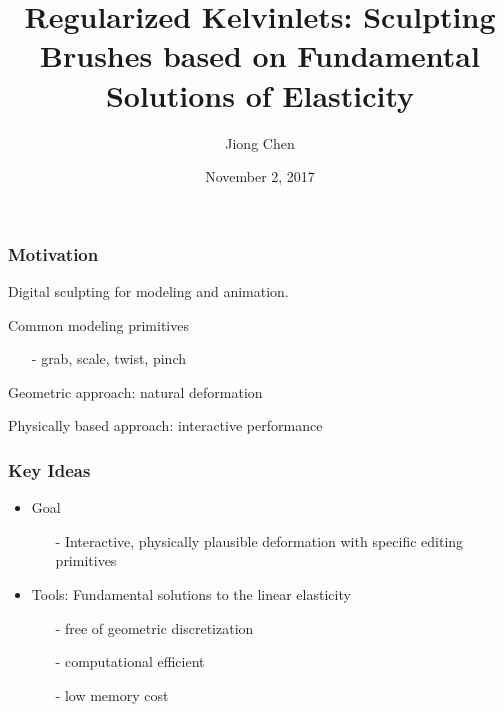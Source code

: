 \documentclass[serif,mathserif, 12pt]{beamer}
\author[Jiong Chen]{Jiong Chen}
\title[\hspace{2em}\insertframenumber/\inserttotalframenumber]{Regularized Kelvinlets: Sculpting Brushes based on Fundamental Solutions of Elasticity}
\date{November 2, 2017}
\begin{document}
\maketitle

\begin{frame}
  \frametitle{Motivation}
  \begin{itemize}
  \item Digital sculpting for modeling and animation.
     {\item Common modeling primitives}
     {
      \begin{itemize}
      \item[-] grab, scale, twist, pinch
      \end{itemize}
      }
     {\item Geometric approach: natural deformation}
     {\item Physically based approach: interactive performance}
  \end{itemize}
\end{frame}

\begin{frame}
  \frametitle{Key Ideas}
  \begin{itemize}
  \item Goal
    \begin{itemize}
    \item[-] Interactive, physically plausible deformation with
    specific editing primitives
    \end{itemize}
    \pause
  \item Tools: Fundamental solutions to the linear elasticity
    \begin{itemize}
    \item[-] free of geometric discretization
    \item[-] computational efficient
    \item[-] low memory cost
    \end{itemize}
  \end{itemize}  
\end{frame}
\end{document}

